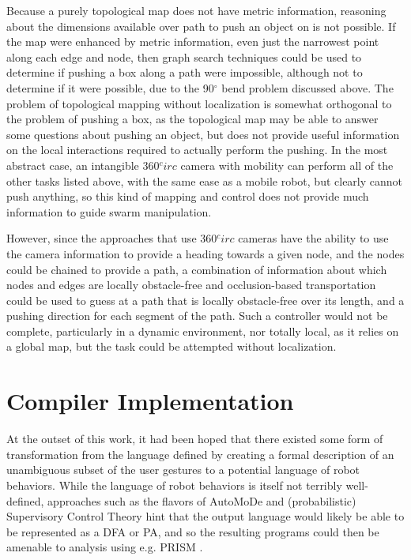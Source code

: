 Because a purely topological map does not have metric information, reasoning about the dimensions available over path to push an object on is not possible. 
If the map were enhanced by metric information, even just the narrowest point along each edge and node, then graph search techniques could be used to determine if pushing a box along a path were impossible, although not to determine if it were possible, due to the 90$^\circ$ bend problem discussed above. 
The problem of topological mapping without localization is somewhat orthogonal to the problem of pushing a box, as the topological map may be able to answer some questions about pushing an object, but does not provide useful information on the local interactions required to actually perform the pushing. 
In the most abstract case, an intangible 360$^circ$ camera with mobility can perform all of the other tasks listed above, with the same ease as a mobile robot, but clearly cannot push anything, so this kind of mapping and control does not provide much information to guide swarm manipulation. 

However, since the approaches that use 360$^circ$ cameras have the ability to use the camera information to provide a heading towards a given node, and the nodes could be chained to provide a path, a combination of information about which nodes and edges are locally obstacle-free and occlusion-based transportation could be used to guess at a path that is locally obstacle-free over its length, and a pushing direction for each segment of the path. 
Such a controller would not be complete, particularly in a dynamic environment, nor totally local, as it relies on a global map, but the task could be attempted without localization. 

\chapter{Compiler Implementation}

At the outset of this work, it had been hoped that there existed some form of transformation from the language defined by creating a formal description of an unambiguous subset of the user gestures to a potential language of robot behaviors. 
While the language of robot behaviors is itself not terribly well-defined, approaches such as the flavors of AutoMoDe and (probabilistic) Supervisory Control Theory hint that the output language would likely be able to be represented as a DFA or PA, and so the resulting programs could then be amenable to analysis using e.g. PRISM \citep{KNP11}.

